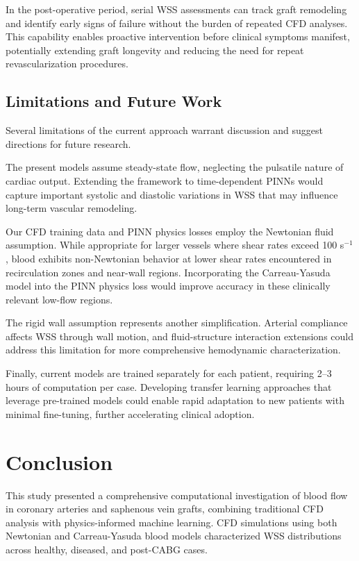 \documentclass[12pt,a4paper]{article}
\begin{document}
In the post-operative period, serial WSS assessments can track graft remodeling and identify early signs of failure without the burden of repeated CFD analyses. This capability enables proactive intervention before clinical symptoms manifest, potentially extending graft longevity and reducing the need for repeat revascularization procedures.

\subsection{Limitations and Future Work}

Several limitations of the current approach warrant discussion and suggest directions for future research.

The present models assume steady-state flow, neglecting the pulsatile nature of cardiac output. Extending the framework to time-dependent PINNs would capture important systolic and diastolic variations in WSS that may influence long-term vascular remodeling.

Our CFD training data and PINN physics losses employ the Newtonian fluid assumption. While appropriate for larger vessels where shear rates exceed 100 s$^{-1}$, blood exhibits non-Newtonian behavior at lower shear rates encountered in recirculation zones and near-wall regions. Incorporating the Carreau-Yasuda model into the PINN physics loss would improve accuracy in these clinically relevant low-flow regions.

The rigid wall assumption represents another simplification. Arterial compliance affects WSS through wall motion, and fluid-structure interaction extensions could address this limitation for more comprehensive hemodynamic characterization.

Finally, current models are trained separately for each patient, requiring 2--3 hours of computation per case. Developing transfer learning approaches that leverage pre-trained models could enable rapid adaptation to new patients with minimal fine-tuning, further accelerating clinical adoption.

\section{Conclusion}

This study presented a comprehensive computational investigation of blood flow in coronary arteries and saphenous vein grafts, combining traditional CFD analysis with physics-informed machine learning. CFD simulations using both Newtonian and Carreau-Yasuda blood models characterized WSS distributions across healthy, diseased, and post-CABG cases.
\end{document}
